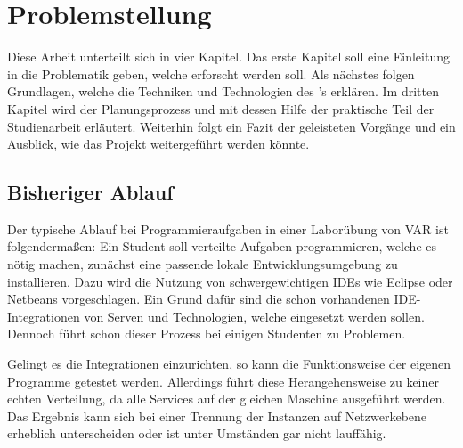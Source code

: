 \chapter{Problemstellung}
Diese Arbeit unterteilt sich in vier Kapitel.
Das erste Kapitel soll eine Einleitung in die Problematik geben, welche erforscht werden soll.
Als nächstes folgen Grundlagen, welche die Techniken und Technologien des 's erklären.
Im dritten Kapitel wird der Planungsprozess und mit dessen Hilfe der praktische Teil der Studienarbeit erläutert.
Weiterhin folgt ein Fazit der geleisteten Vorgänge und ein Ausblick, wie das Projekt weitergeführt werden könnte.

\section{Bisheriger Ablauf}
Der typische Ablauf bei Programmieraufgaben in einer Laborübung von  \ac{VAR} ist folgendermaßen:
Ein Student soll verteilte Aufgaben programmieren, welche es nötig machen, zunächst eine passende lokale Entwicklungsumgebung zu installieren.
Dazu wird die Nutzung von schwergewichtigen \acp{IDE} wie Eclipse oder Netbeans vorgeschlagen.
Ein Grund dafür sind die schon vorhandenen \ac{IDE}-Integrationen von Serven und Technologien, welche eingesetzt werden sollen.
Dennoch führt schon dieser Prozess bei einigen Studenten zu Problemen.
\par
Gelingt es die Integrationen einzurichten, so kann die Funktionsweise der eigenen Programme getestet werden.
Allerdings führt diese Herangehensweise zu keiner echten Verteilung, da alle Services auf der gleichen Maschine ausgeführt werden.
Das Ergebnis kann sich bei einer Trennung der Instanzen auf Netzwerkebene erheblich unterscheiden oder ist unter Umständen gar nicht lauffähig.
